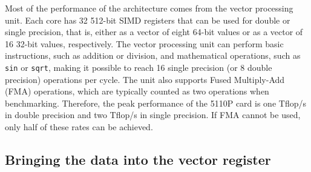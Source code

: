 \documentclass[10pt,conference,compsocconf]{IEEEtran}
\begin{document}
Most of the performance of the architecture comes from the vector
processing unit. Each core has 32 512-bit SIMD registers that can be
used for double or single precision, that is, either as a vector of eight
64-bit values or as a vector of 16 32-bit values, respectively. The
vector processing unit can perform basic instructions, such as
addition or division, and mathematical operations, such as {\tt sin} or
{\tt sqrt}, making it possible to reach 16 single precision (or 8 double precision)
operations per cycle.  
The unit also supports Fused Multiply-Add (FMA)
operations, which are typically counted as two operations 
when benchmarking. Therefore, the peak performance of the 5110P
card is one Tflop/s in double precision and two Tflop/s in single
precision. If FMA cannot be used, only half of these rates can be
achieved.


\subsection{Bringing the data into the vector register}
\end{document}
